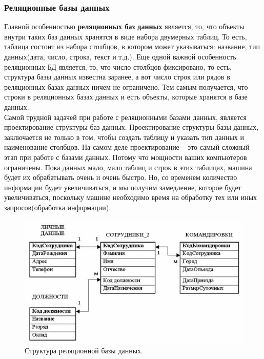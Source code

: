 \documentclass[a4paper, 10pt]{article}
\begin{document}
	\subsubsection{Реляционные базы данных}
	\hspace*{5mm} Главной особенностью \textbf{реляционных баз данных} является, то, что объекты внутри таких баз данных хранятся в виде набора двумерных таблиц. То есть, таблица состоит из набора столбцов, в котором может указываться: название, тип данных(дата, число, строка, текст и т.д.). Еще одной важной особенность реляционных БД является, то, что число столбцов фиксировано, то есть, структура базы данных известна заранее, а вот число строк или рядов в реляционных базах данных ничем не ограничено. Тем самым получается, что строки в реляционных базах данных и есть объекты, которые хранятся в базе данных.
	\\ \hspace*{5mm} Самой трудной задачей при работе с реляционными базами данных, является проектирование структуры баз данных. Проектирование структуры базы данных, заключается не только в том, чтобы создать таблицу и указать тип данных и наименование столбцов. На самом деле проектирование – это самый сложный этап при работе с базами данных. Потому что мощности ваших компьютеров ограничены. Пока данных мало, мало таблиц и строк в этих таблицах, машина будет их обрабатывать очень и очень быстро. Но, со временем количество информации будет увеличиваться, и мы получим замедление, которое будет увеличиваться, поскольку машине необходимо время на обработку тех или иных запросов(обработка информации).
	\clearpage
	\newpage
	\begin{figure}[h!]
		\centering
		\includegraphics[scale=1]{type3}
		\centering\caption{Структура реляционной базы данных.}
	\end{figure}
\end{document}
